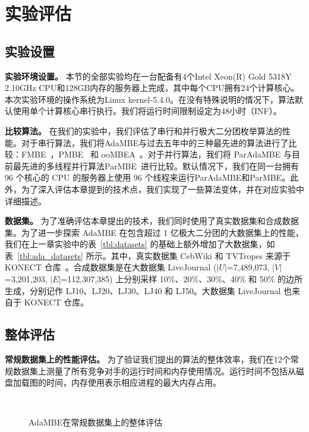 \section{实验评估}

\subsection{实验设置}

\textbf{实验环境设置。} 本节的全部实验均在一台配备有4个Intel Xeon(R) Gold 5318Y 2.10GHz CPU和128GB内存的服务器上完成，其中每个CPU拥有24个计算核心。本次实验环境的操作系统为Linux kernel-5.4.0。在没有特殊说明的情况下，算法默认使用单个计算核心串行执行。我们将运行时间限制设定为48小时（INF）。

\textbf{比较算法。} 在我们的实验中，我们评估了串行和并行极大二分团枚举算法的性能。对于串行算法，我们将AdaMBE与过去五年中的三种最先进的算法进行了比较：FMBE~\cite{parMBE18}，PMBE~\cite{PMBE20} 和 ooMBEA~\cite{ooMBE22}。对于并行算法，我们将 ParAdaMBE 与目前最先进的多线程并行算法ParMBE~\cite{parMBE18}进行比较。默认情况下，我们在同一台拥有 96 个核心的 CPU 的服务器上使用 96 个线程来运行ParAdaMBE和ParMBE。此外，为了深入评估本章提到的技术点，我们实现了一些算法变体，并在对应实验中详细描述。




\textbf{数据集。} 为了准确评估本章提出的技术，我们同时使用了真实数据集和合成数据集。为了进一步探索 AdaMBE 在包含超过 1 亿极大二分团的大数据集上的性能，我们在上一章实验中的表~\ref{tbl:datasets} 的基础上额外增加了大数据集，如表~\ref{tbl:ada_datasets} 所示。其中，真实数据集 CebWiki 和 TVTropes 来源于 KONECT 仓库~\cite{konect}。合成数据集是在大数据集 LiveJournal ($|U|$=7,489,073, $|V|$=3,201,203, $|E|$=112,307,385) 上分别采样 10\%、20\%、30\%、40\% 和 50\% 的边所生成，分别记作 LJ10、LJ20、LJ30、LJ40 和 LJ50。大数据集 LiveJournal 也来自于 KONECT 仓库。

\subsection{整体评估}

\textbf{常规数据集上的性能评估。} 为了验证我们提出的算法的整体效率，我们在12个常规数据集上测量了所有竞争对手的运行时间和内存使用情况。运行时间不包括从磁盘加载图的时间，内存使用表示相应进程的最大内存占用。


\begin{figure} [H]
  \centering
	\vspace{0.1in}
	\\
  \caption{AdaMBE在常规数据集上的整体评估}
  \label{fig:ada_overall}

\end{figure}

